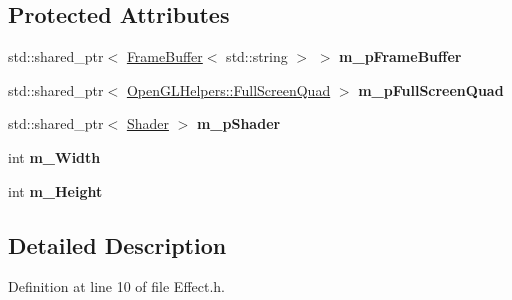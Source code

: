 \subsection*{Protected Attributes}
\begin{DoxyCompactItemize}
\item 
std\+::shared\+\_\+ptr$<$ \hyperlink{class_frame_buffer}{Frame\+Buffer}$<$ std\+::string $>$ $>$ {\bfseries m\+\_\+p\+Frame\+Buffer}\hypertarget{class_post_process_1_1_effect_aa488936ef39986fab438ad778fdd1eb5}{}\label{class_post_process_1_1_effect_aa488936ef39986fab438ad778fdd1eb5}

\item 
std\+::shared\+\_\+ptr$<$ \hyperlink{class_open_g_l_helpers_1_1_full_screen_quad}{Open\+G\+L\+Helpers\+::\+Full\+Screen\+Quad} $>$ {\bfseries m\+\_\+p\+Full\+Screen\+Quad}\hypertarget{class_post_process_1_1_effect_ac048d2f0b7c2180359ea4416f6dc8b82}{}\label{class_post_process_1_1_effect_ac048d2f0b7c2180359ea4416f6dc8b82}

\item 
std\+::shared\+\_\+ptr$<$ \hyperlink{class_shader}{Shader} $>$ {\bfseries m\+\_\+p\+Shader}\hypertarget{class_post_process_1_1_effect_a2d04105296d1b8be2849e38be42f23f3}{}\label{class_post_process_1_1_effect_a2d04105296d1b8be2849e38be42f23f3}

\item 
int {\bfseries m\+\_\+\+Width}\hypertarget{class_post_process_1_1_effect_a0877d8b2d098049afacd836c4b5d4de7}{}\label{class_post_process_1_1_effect_a0877d8b2d098049afacd836c4b5d4de7}

\item 
int {\bfseries m\+\_\+\+Height}\hypertarget{class_post_process_1_1_effect_a43a25397d0d839d4d46e77df28a23aea}{}\label{class_post_process_1_1_effect_a43a25397d0d839d4d46e77df28a23aea}

\end{DoxyCompactItemize}


\subsection{Detailed Description}


Definition at line 10 of file Effect.\+h.


